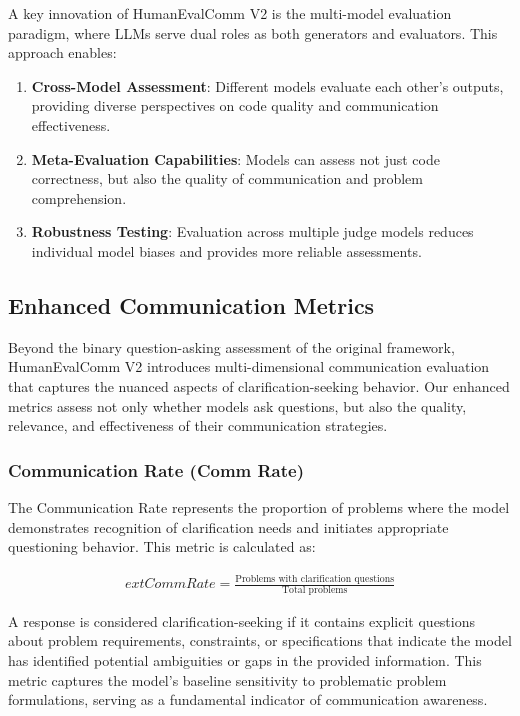 \documentclass[conference]{IEEEtran}
\begin{document}
A key innovation of HumanEvalComm V2 is the multi-model evaluation paradigm, where LLMs serve dual roles as both generators and evaluators. This approach enables:

\begin{enumerate}
    \item \textbf{Cross-Model Assessment}: Different models evaluate each other's outputs, providing diverse perspectives on code quality and communication effectiveness.
    \item \textbf{Meta-Evaluation Capabilities}: Models can assess not just code correctness, but also the quality of communication and problem comprehension.
    \item \textbf{Robustness Testing}: Evaluation across multiple judge models reduces individual model biases and provides more reliable assessments.
\end{enumerate}

\subsection{Enhanced Communication Metrics}

Beyond the binary question-asking assessment of the original framework, HumanEvalComm V2 introduces multi-dimensional communication evaluation that captures the nuanced aspects of clarification-seeking behavior. Our enhanced metrics assess not only whether models ask questions, but also the quality, relevance, and effectiveness of their communication strategies.

\subsubsection{Communication Rate (Comm Rate)}

The Communication Rate represents the proportion of problems where the model demonstrates recognition of clarification needs and initiates appropriate questioning behavior. This metric is calculated as:

\begin{align}
	ext{Comm Rate} = \frac{\text{Problems with clarification questions}}{\text{Total problems}}
\end{align}

A response is considered clarification-seeking if it contains explicit questions about problem requirements, constraints, or specifications that indicate the model has identified potential ambiguities or gaps in the provided information. This metric captures the model's baseline sensitivity to problematic problem formulations, serving as a fundamental indicator of communication awareness.
\end{document}
